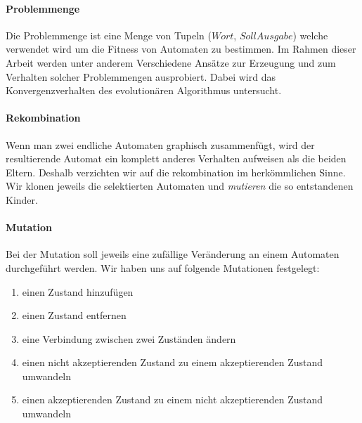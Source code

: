 \paragraph{Problemmenge}
Die Problemmenge ist eine Menge von Tupeln ($Wort$, $Soll Ausgabe$) welche verwendet wird um die Fitness von Automaten zu bestimmen. Im Rahmen dieser Arbeit werden unter anderem Verschiedene Ansätze zur Erzeugung und zum Verhalten solcher Problemmengen ausprobiert. Dabei wird das Konvergenzverhalten des evolutionären Algorithmus untersucht.

\paragraph{Rekombination}
Wenn man zwei endliche Automaten graphisch zusammenfügt, wird der resultierende Automat ein komplett anderes Verhalten aufweisen als die beiden Eltern. Deshalb verzichten wir auf die rekombination im herkömmlichen Sinne. Wir klonen jeweils die selektierten Automaten und \textit{mutieren} die so entstandenen Kinder.

\paragraph{Mutation}
Bei der Mutation soll jeweils eine zufällige Veränderung an einem Automaten durchgeführt werden. Wir haben uns auf folgende Mutationen festgelegt:
\begin{enumerate}
	\item einen Zustand hinzufügen
	\item einen Zustand entfernen
	\item eine Verbindung zwischen zwei Zuständen ändern
	\item einen nicht akzeptierenden Zustand zu einem akzeptierenden Zustand umwandeln
	\item einen akzeptierenden Zustand zu einem nicht akzeptierenden Zustand umwandeln
\end{enumerate}